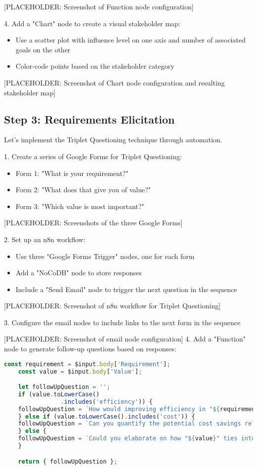 [PLACEHOLDER: Screenshot of Function node configuration]

4. Add a "Chart" node to create a visual stakeholder map:
\begin{itemize}
    \item Use a scatter plot with influence level on one axis and number of associated goals on the other
    \item Color-code points based on the stakeholder category
\end{itemize}

[PLACEHOLDER: Screenshot of Chart node configuration and resulting stakeholder map]

\subsection{Step 3: Requirements Elicitation}

Let's implement the Triplet Questioning technique through automation.

1. Create a series of Google Forms for Triplet Questioning:
\begin{itemize}
    \item Form 1: "What is your requirement?"
    \item Form 2: "What does that give you of value?"
    \item Form 3: "Which value is most important?"
\end{itemize}

[PLACEHOLDER: Screenshots of the three Google Forms]

2. Set up an n8n workflow:
\begin{itemize}
    \item Use three "Google Forms Trigger" nodes, one for each form
    \item Add a "NoCoDB" node to store responses
    \item Include a "Send Email" node to trigger the next question in the sequence
\end{itemize}

[PLACEHOLDER: Screenshot of n8n workflow for Triplet Questioning]

3. Configure the email nodes to include links to the next form in the sequence

[PLACEHOLDER: Screenshot of email node configuration]
%
4. Add a "Function" node to generate follow-up questions based on responses:
\begin{lstlisting}[language=Javascript]
    const requirement = $input.body['Requirement'];
    const value = $input.body['Value'];

    let followUpQuestion = '';
    if (value.toLowerCase()
                .includes('efficiency')) {
    followUpQuestion = `How would improving efficiency in "${requirement}" impact your daily operations?`;
    } else if (value.toLowerCase().includes('cost')) {
    followUpQuestion = `Can you quantify the potential cost savings related to "${requirement}"?`;
    } else {
    followUpQuestion = `Could you elaborate on how "${value}" ties into your overall business objectives?`;
    }

    return { followUpQuestion };
\end{lstlisting}

